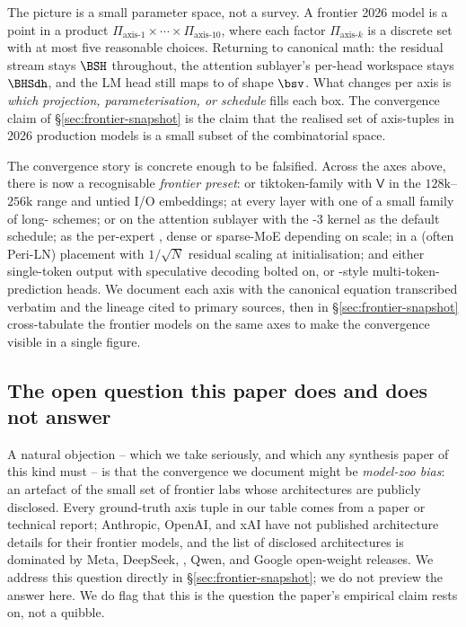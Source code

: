 \begin{intuition}
The picture is a small parameter space, not a survey. A frontier 2026
model is a point in a product
$\Pi_{\text{axis-1}} \times \cdots \times \Pi_{\text{axis-10}}$,
where each factor $\Pi_{\text{axis-}k}$ is a discrete set with at most
five reasonable choices. Returning to canonical math: the residual
stream stays $\BSH$ throughout, the attention sublayer's per-head
workspace stays $\BHSdh$, and the LM head still maps to  of
shape $\bsv$. What changes per axis is \emph{which projection,
parameterisation, or schedule} fills each box. The convergence claim
of \S\ref{sec:frontier-snapshot} is the claim that the realised set
of axis-tuples in 2026 production models is a small subset of the
combinatorial space.
\end{intuition}

The convergence story is concrete enough to be falsified. Across the
axes above, there is now a recognisable \emph{frontier preset}:
 or tiktoken-family  with $\mathsf{V}$ in the
$128\text{k}$--$256\text{k}$ range and untied I/O embeddings;  at
every layer with one of a small family of long-
schemes;  or  on the attention sublayer with the -3
kernel as the default schedule;  as the per-expert , dense or
sparse-MoE depending on scale;  in a  (often Peri-LN)
placement with $1/\sqrt{N}$ residual scaling at initialisation; and
either single-token output with speculative decoding bolted on, or
-style multi-token-prediction heads. We document each axis
with the canonical equation transcribed verbatim and the lineage cited
to primary sources, then in \S\ref{sec:frontier-snapshot} cross-tabulate
the frontier models on the same axes to make the convergence visible
in a single figure.

\subsection*{The open question this paper does and does not answer}

A natural objection -- which we take seriously, and which any
synthesis paper of this kind must -- is that the convergence we
document might be \emph{model-zoo bias}: an artefact of the small set
of frontier labs whose architectures are publicly disclosed. Every
ground-truth axis tuple in our table comes from a paper or technical
report; Anthropic, OpenAI, and xAI have not published architecture
details for their frontier models, and the list of disclosed
architectures is dominated by Meta, DeepSeek, , Qwen, and
Google open-weight releases. We address this question directly in
\S\ref{sec:frontier-snapshot}; we do not preview the answer here. We
do flag that this is the question the paper's empirical claim rests on,
not a quibble.

